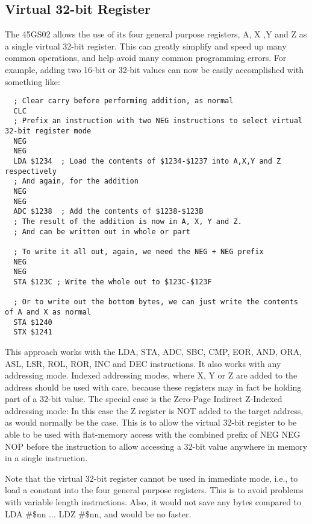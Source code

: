 \subsection{Virtual 32-bit Register}

The 45GS02 allows the use of its four general purpose registers, A, X ,Y and Z as a single virtual 32-bit register. This can greatly
simplify and speed up many common operations, and help avoid many common programming errors.
For example, adding two 16-bit or 32-bit values can now be easily accomplished with something like:

\begin{tcolorbox}[colback=black,coltext=white]
\verbatimfont{\codefont}
\begin{verbatim}
  ; Clear carry before performing addition, as normal
  CLC
  ; Prefix an instruction with two NEG instructions to select virtual 32-bit register mode
  NEG
  NEG
  LDA $1234  ; Load the contents of $1234-$1237 into A,X,Y and Z respectively
  ; And again, for the addition
  NEG
  NEG
  ADC $1238  ; Add the contents of $1238-$123B
  ; The result of the addition is now in A, X, Y and Z.
  ; And can be written out in whole or part

  ; To write it all out, again, we need the NEG + NEG prefix
  NEG
  NEG
  STA $123C ; Write the whole out to $123C-$123F

  ; Or to write out the bottom bytes, we can just write the contents of A and X as normal
  STA $1240
  STX $1241
\end{verbatim}
\end{tcolorbox}

This approach works with the LDA, STA, ADC, SBC, CMP, EOR, AND, ORA, ASL, LSR, ROL, ROR, INC and DEC instructions.
It also works with any addressing mode.  Indexed addressing modes, where X, Y or Z are added to the address should
be used with care, because these registers may in fact be holding part of a 32-bit value.  The special case is the Zero-Page
Indirect Z-Indexed addressing mode: In this case the Z register is NOT added to the target address, as would normally
be the case. This is to allow the virtual 32-bit register to be able to be used with flat-memory access with the combined prefix of
NEG NEG NOP before the instruction to allow accessing a 32-bit value anywhere in memory in a single instruction.

Note that the virtual 32-bit register cannot be used in immediate mode, i.e., to load a constant into the four general
purpose registers.  This is to
avoid problems with variable length instructions. Also, it would not save any bytes
compared to LDA \#\$nn ... LDZ \#\$nn, and would be no faster.


